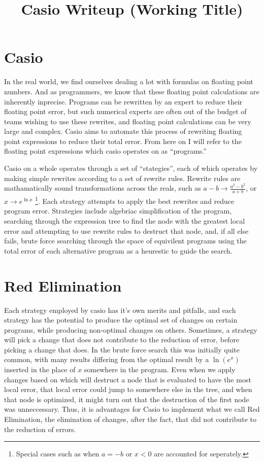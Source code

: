 \documentclass{article}
\title{Casio Writeup (Working Title)}
\newcommand{\lnexp}[1]{\ln{\left(e^{#1}\right)}}
\begin{document}
\maketitle

\section{Casio}

In the real world, 
we find ourselves dealing a lot with formulas 
on floating point numbers. 
And as programmers, 
we know that these floating point calculations 
are inherently inprecise. 
Programs can be rewritten by an expert to reduce their floating point error, 
but such numerical experts are often out of the budget of teams wishing to use these rewrites, 
and floating point calculations can be very large and complex. 
Casio aims to automate this process of rewriting floating point expressions 
to reduce their total error. 
From here on I will refer to the floating point expressions 
which casio operates on 
as ``programs.''

Casio on a whole operates through a set of ``stategies'', 
each of which operates by making simple rewrites according to a set of rewrite rules. 
Rewrite rules are mathamatically sound transformations across the reals, 
such as $a - b \to \frac{a^2 - b^2}{a + b}$, 
or $x \to e^{\ln{x}}$
\footnote{Special cases such as when $a = -b$ or $x < 0$ are accounted for seperately.}.
Each strategy attempts to apply the best rewrites 
and reduce program error. 
Strategies include algebriac simplification of the program, 
searching through the expression tree to find the node with the greatest local error 
and attempting to use rewrite rules to destruct that node, 
and, if all else fails, 
brute force searching through the space of equivilent programs 
using the total error of each alternative program 
as a heurestic to guide the search.

\section{Red Elimination}

Each strategy employed by casio 
has it's own merits and pitfalls, 
and each strategy has the potential 
to produce the optimal set of changes on certain programs, 
while producing non-optimal changes on others. 
Sometimes, a strategy will pick a change 
that does not contribute to the reduction of error, 
before picking a change that does. 
In the brute force search this was initially quite common, 
with many results differing from the optimal result 
by a $\lnexp{x}$ inserted in the place of $x$ 
somewhere in the program. 
Even when we apply changes based on which will destruct a node 
that is evaluated to have the most local error, 
that local error could jump to somewhere else in the tree, 
and when that node is optimized, 
it might turn out that the destruction of the first node was unneccessary. 
Thus, it is advantages for Casio 
to implement what we call Red Elimination, 
the elimination of changes, after the fact, 
that did not contribute to the reduction of errors.
\end{document}
